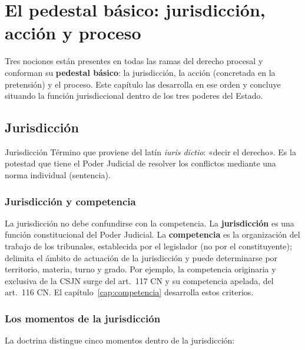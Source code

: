 \documentclass[12pt,oneside]{book}
\begin{document}
\chapter{El pedestal básico: jurisdicción, acción y proceso}
\label{cap:pedestal}

Tres nociones están presentes en todas las ramas del derecho procesal y conforman su \textbf{pedestal básico}: la jurisdicción, la acción (concretada en la pretensión) y el proceso. Este capítulo las desarrolla en ese orden y concluye situando la función jurisdiccional dentro de los tres poderes del Estado.

\section{Jurisdicción}

\begin{definition}{Jurisdicción}
Término que proviene del latín \textit{iuris dictio}: «decir el derecho». Es la potestad que tiene el Poder Judicial de resolver los conflictos mediante una norma individual (sentencia).
\end{definition}

\subsection{Jurisdicción y competencia}

La jurisdicción no debe confundirse con la competencia. La \textbf{jurisdicción} es una función constitucional del Poder Judicial. La \textbf{competencia} es la organización del trabajo de los tribunales, establecida por el legislador (no por el constituyente); delimita el ámbito de actuación de la jurisdicción y puede determinarse por territorio, materia, turno y grado. Por ejemplo, la competencia originaria y exclusiva de la CSJN surge del art.~117 CN y su competencia apelada, del art.~116 CN. El capítulo~\ref{cap:competencia} desarrolla estos criterios.

\subsection{Los momentos de la jurisdicción}

La doctrina distingue cinco momentos dentro de la jurisdicción:
\end{document}
